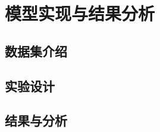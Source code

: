 \chapter[\hspace{0pt}模型实现与结果分析]{{\heiti{}\hspace{0pt}模型实现与结果分析}}\label{chapter4: 模型实现与结果分析}
\removelofgap
\removelotgap

\section[\hspace{-2pt}数据集介绍]{{\heiti{} \hspace{-8pt}数据集介绍}}\label{section4: 数据集介绍}

\section[\hspace{-2pt}实验设计]{{\heiti{} \hspace{-8pt}实验设计}}\label{section4: 实验设计}

\section[\hspace{-2pt}结果与分析]{{\heiti{} \hspace{-8pt}结果与分析}}\label{section4: 结果与分析}